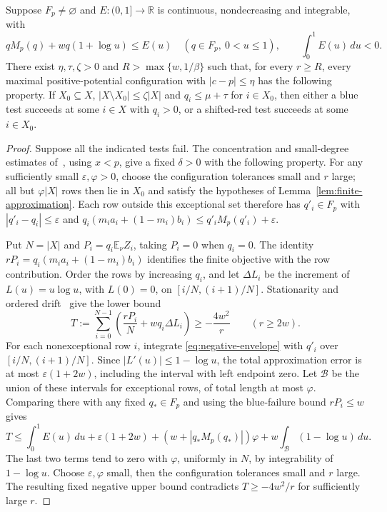 \begin{proposition}\label{prop:local-alternative}
Suppose $F_p\ne\varnothing$ and $E:(0,1]\to\mathbb R$ is continuous,
nondecreasing and integrable, with
\begin{equation}\label{eq:negative-envelope}
 qM_p(q)+wq(1+\log u)\le E(u)
 \quad(q\in F_p,\ 0<u\le1),\qquad
 \int_0^1E(u)\,du<0.
\end{equation}
There exist $\eta,\tau,\zeta>0$ and $R>\max\{w,1/\beta\}$ such that,
for every $r\ge R$, every maximal positive-potential configuration with
$|c-p|\le\eta$ has the following property. If $X_0\subseteq X$,
$|X\setminus X_0|\le\zeta|X|$ and $q_i\le\mu+\tau$ for $i\in X_0$,
then either a blue test succeeds at some $i\in X$ with $q_i>0$, or a
shifted-red test succeeds at some $i\in X_0$.
\end{proposition}
\begin{proof}
Suppose all the indicated tests fail. The concentration and small-degree
estimates of~\cite[Proposition~3.5, Steps~2 and~5]{ZBS}, using $x<p$,
give a fixed $\delta>0$ with the following property. For any sufficiently
small $\varepsilon,\varphi>0$, choose the configuration tolerances small
and $r$ large; all but $\varphi|X|$ rows then lie in $X_0$ and satisfy
the hypotheses of Lemma~\ref{lem:finite-approximation}. Each row outside this
exceptional set therefore has $q'_i\in F_p$ with $|q'_i-q_i|\le\varepsilon$
and $q_i(m_i a_i+(1-m_i)b_i)\le q'_iM_p(q'_i)+\varepsilon$.

Put $N=|X|$ and $P_i=q_i\mathbb E_\nu Z_i$, taking $P_i=0$ when
$q_i=0$. The identity $rP_i=q_i(m_i a_i+(1-m_i)b_i)$ identifies
the finite objective with the row contribution.
Order the rows by increasing $q_i$, and let $\Delta L_i$ be the
increment of $L(u)=u\log u$, with $L(0)=0$, on $[i/N,(i+1)/N]$.
Stationarity and ordered drift~\cite[Proposition~3.5, Steps~3--4]{ZBS}
give the lower bound
\[
 T:=\sum_{i=0}^{N-1}\left(\frac{rP_i}{N}+wq_i\Delta L_i\right)
 \ge-\frac{4w^2}{r}\qquad(r\ge2w).
\]
For each nonexceptional row $i$, integrate \eqref{eq:negative-envelope}
with $q'_i$ over $[i/N,(i+1)/N]$. Since $|L'(u)|\le1-\log u$, the total
approximation error is at most $\varepsilon(1+2w)$, including the
interval with left endpoint zero. Let $\mathcal B$ be the union of these
intervals for exceptional rows, of total length at most $\varphi$. Comparing there with
any fixed $q_*\in F_p$ and using the blue-failure bound $rP_i\le w$
gives
\[
 T\le\int_0^1E(u)\,du+\varepsilon(1+2w)
 +(w+|q_*M_p(q_*)|)\varphi
 +w\int_{\mathcal B}(1-\log u)\,du.
\]
The last two terms tend to zero with $\varphi$, uniformly in $N$,
by integrability of $1-\log u$. Choose $\varepsilon,\varphi$ small,
then the configuration tolerances small and $r$ large. The resulting
fixed negative upper bound contradicts $T\ge-4w^2/r$ for sufficiently
large $r$.
\end{proof}
